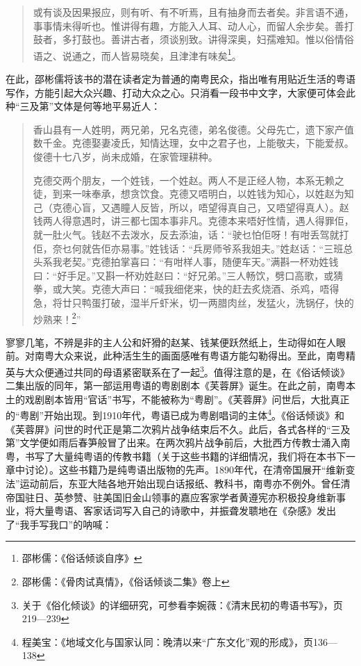 \begin{quote}
或有谈及因果报应，则有听、有不听焉，且有抽身而去者矣。非言语不通，事事情未得听也。惟讲得有趣，方能入人耳、动人心，而留人余步矣。善打鼓者，多打鼓也。善讲古者，须谈别致。讲得深奥，妇孺难知。惟以俗情俗语之、说通之，而人皆易晓矣，且津津有味矣\footnote{邵彬儒：《俗话倾谈自序》}。
\end{quote}

在此，邵彬儒将该书的潜在读者定为普通的南粤民众，指出唯有用贴近生活的粤语写作，方能引起大众兴趣、打动大众之心。只消看一段书中文字，大家便可体会此种“三及第”文体是何等地平易近人：

\begin{quote}
香山县有一人姓明，两兄弟，兄名克德，弟名俊德。父母先亡，遗下家产值数千金。克德娶妻凌氏，知情达理，女中之君子也，上能敬夫，下能爱叔。俊德十七八岁，尚未成婚，在家管理耕种。

克德交两个朋友，一个姓钱，一个姓赵。两人不是正经人物，本系无赖之徒，到来一味奉承，想贪饮食。克德又唔明白，以姓钱为知心，以姓赵为知己（克德心盲，又遇瞳人反皆，所以，唔望得真自己，又唔望得真人）。赵钱两人得意遇时，讲三都七国本事非凡。克德本来唔好性情，遇人得罪佢，就一肚火气。钱赵不去泼水，反去添油，话：“驶乜怕佢呀！有咁丢驾就打佢，奈乜何就告佢亦易事。”姓钱话：“兵房师爷系我姐夫。”姓赵话：“三班总头系我老契。”克德拍掌喜曰：“有咁样人事，随便车天。”满斟一杯劝姓钱曰：“好手足。”又斟一杯劝姓赵曰：“好兄弟。”三人畅饮，劈口高歌，或猜拳，或大笑。克德大声曰：“喊我细佬来，快的赶去炙烧酒、杀鸡，唔得急，将廿只鸭蛋打破，湿半斤虾米，切一两腊肉丝，发猛火，洗锅仔，快的炒熟来！\footnote{邵彬儒：《骨肉试真情》，《俗话倾谈二集》卷上}”
\end{quote}

寥寥几笔，不辨是非的主人公和奸猾的赵某、钱某便跃然纸上，生动得如在人眼前。对南粤大众来说，此种活生生的画面感唯有粤语方能勾勒得出。至此，南粤精英与大众便通过共同的母语紧密联系在了一起\footnote{关于《俗化倾谈》的详细研究，可参看李婉薇：《清末民初的粤语书写》，页219—239}。值得注意的是，在《俗话倾谈》二集出版的同年，第一部运用粤语的粤剧剧本《芙蓉屏》诞生。在此之前，南粤本土的戏剧剧本皆用“官话”书写，不能被称为“粤剧”。《芙蓉屏》问世后，大批真正的“粤剧”开始出现。到1910年代，粤语已成为粤剧唱词的主体\footnote{程美宝：《地域文化与国家认同：晚清以来“广东文化”观的形成》，页136—138}。《俗话倾谈》和《芙蓉屏》问世的时代正是第二次鸦片战争结束后不久。此后，各式各样的“三及第”文学便如雨后春笋般冒了出来。在两次鸦片战争前后，大批西方传教士涌入南粤，书写了大量纯粤语的传教书籍（关于这些书籍的详细情况，我们将在本书下一章中讨论）。这些书籍乃是纯粤语出版物的先声。1890年代，在清帝国展开“维新变法”运动前后，东亚大陆各地开始出现白话报纸、教科书，南粤亦不例外。曾任清帝国驻日、英参赞、驻美国旧金山领事的嘉应客家学者黄遵宪亦积极投身维新事业，将大量粤语、客家话词写入自己的诗歌中，并振聋发聩地在《杂感》发出了“我手写我口”的呐喊：

